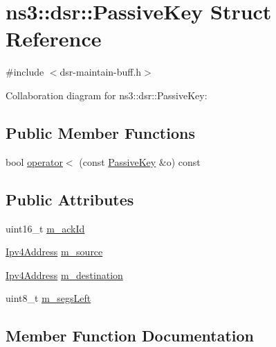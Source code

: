 \hypertarget{structns3_1_1dsr_1_1PassiveKey}{}\section{ns3\+:\+:dsr\+:\+:Passive\+Key Struct Reference}
\label{structns3_1_1dsr_1_1PassiveKey}


{\ttfamily \#include $<$dsr-\/maintain-\/buff.\+h$>$}



Collaboration diagram for ns3\+:\+:dsr\+:\+:Passive\+Key\+:
\subsection*{Public Member Functions}
\begin{DoxyCompactItemize}
\item 
bool \hyperlink{structns3_1_1dsr_1_1PassiveKey_aa630ef70fed1d35d06d5435c819cb341}{operator$<$} (const \hyperlink{structns3_1_1dsr_1_1PassiveKey}{Passive\+Key} \&o) const 
\end{DoxyCompactItemize}
\subsection*{Public Attributes}
\begin{DoxyCompactItemize}
\item 
uint16\+\_\+t \hyperlink{structns3_1_1dsr_1_1PassiveKey_af7c4196fee6a90ac6136f57c380f21cf}{m\+\_\+ack\+Id}
\item 
\hyperlink{classns3_1_1Ipv4Address}{Ipv4\+Address} \hyperlink{structns3_1_1dsr_1_1PassiveKey_a43436e6986b6008da86683cfa9c93ec0}{m\+\_\+source}
\item 
\hyperlink{classns3_1_1Ipv4Address}{Ipv4\+Address} \hyperlink{structns3_1_1dsr_1_1PassiveKey_a3b7bc9fdf37087cae84e8792c89027d2}{m\+\_\+destination}
\item 
uint8\+\_\+t \hyperlink{structns3_1_1dsr_1_1PassiveKey_abf5474b90f50af2385b6423eb9ec4793}{m\+\_\+segs\+Left}
\end{DoxyCompactItemize}


\subsection{Member Function Documentation}
